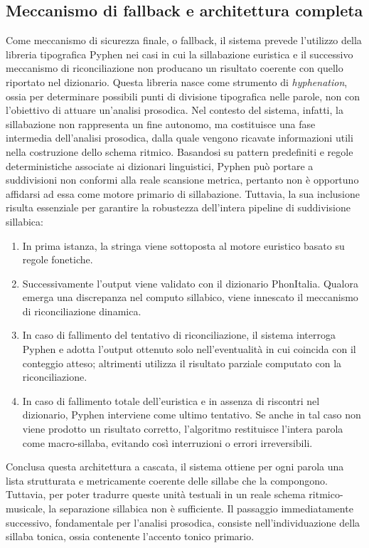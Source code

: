 \subsection{Meccanismo di fallback e architettura completa}
Come meccanismo di sicurezza finale, o fallback, il sistema prevede l'utilizzo della libreria tipografica Pyphen nei casi in cui la sillabazione euristica 
e il successivo meccanismo di riconciliazione non producano un risultato coerente con quello riportato nel dizionario. Questa libreria nasce come strumento 
di \textit{hyphenation}, ossia per determinare possibili punti di divisione tipografica nelle parole, non con l'obiettivo di attuare un'analisi prosodica. 
Nel contesto del sistema, infatti, la sillabazione non rappresenta un fine autonomo, ma costituisce una fase intermedia dell'analisi prosodica, 
dalla quale vengono ricavate informazioni utili nella costruzione dello schema ritmico. Basandosi su pattern predefiniti e regole deterministiche associate 
ai dizionari linguistici, Pyphen può portare a suddivisioni non conformi alla reale scansione metrica, pertanto non è opportuno affidarsi ad essa come 
motore primario di sillabazione. Tuttavia, la sua inclusione risulta essenziale per garantire la robustezza dell'intera pipeline di suddivisione sillabica:
\begin{enumerate}
      \item In prima istanza, la stringa viene sottoposta al motore euristico basato su regole fonetiche.
      \item Successivamente l'output viene validato con il dizionario PhonItalia. Qualora emerga una discrepanza nel computo sillabico, viene innescato 
            il meccanismo di riconciliazione dinamica.
      \item In caso di fallimento del tentativo di riconciliazione, il sistema interroga Pyphen e adotta l'output ottenuto solo nell'eventualità in cui 
            coincida con il conteggio atteso; altrimenti utilizza il risultato parziale computato con la riconciliazione.
      \item In caso di fallimento totale dell'euristica e in assenza di riscontri nel dizionario, Pyphen interviene come ultimo tentativo. Se anche in tal 
            caso non viene prodotto un risultato corretto, l'algoritmo restituisce l'intera parola come macro-sillaba, evitando così interruzioni o errori 
            irreversibili.
\end{enumerate}

Conclusa questa architettura a cascata, il sistema ottiene per ogni parola una lista strutturata e metricamente coerente delle sillabe che la compongono. 
Tuttavia, per poter tradurre queste unità testuali in un reale schema ritmico-musicale, la separazione sillabica non è sufficiente. Il passaggio 
immediatamente successivo, fondamentale per l'analisi prosodica, consiste nell'individuazione della sillaba tonica, ossia contenente l'accento tonico primario.

